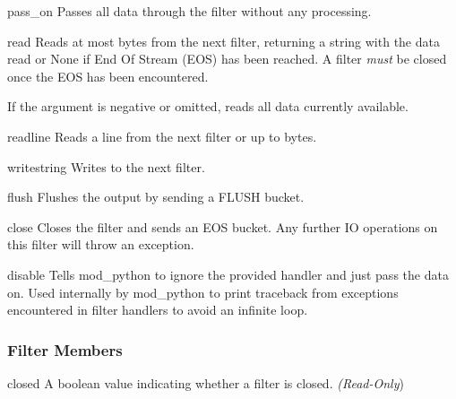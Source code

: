 \begin{methoddesc}[filter]{pass_on}{}
  Passes all data through the filter without any processing.
\end{methoddesc}

\begin{methoddesc}[filter]{read}{}
  Reads at most  bytes from the next filter, returning a string
  with the data read or None if End Of Stream (EOS) has been reached. A
  filter \emph{must} be closed once the EOS has been encountered.

  If the  argument is negative or omitted, reads all data
  currently available.
\end{methoddesc}

\begin{methoddesc}[filter]{readline}{}
  Reads a line from the next filter or up to  bytes.
\end{methoddesc}

\begin{methoddesc}[filter]{write}{string}
  Writes  to the next filter.
\end{methoddesc}

\begin{methoddesc}[filter]{flush}{}
  Flushes the output by sending a FLUSH bucket.
\end{methoddesc}

\begin{methoddesc}[filter]{close}{}
  Closes the filter and sends an EOS bucket. Any further IO operations on
  this filter will throw an exception.
\end{methoddesc}

\begin{methoddesc}[filter]{disable}{}
  Tells mod_python to ignore the provided handler and just pass the data
  on. Used internally by mod_python to print traceback from exceptions
  encountered in filter handlers to avoid an infinite loop.
\end{methoddesc}

\subsubsection{Filter Members\label{pyapi-mpfilt-mem}}

\begin{memberdesc}[filter]{closed}
  A boolean value indicating whether a filter is closed.
  \emph{(Read-Only})
\end{memberdesc}


